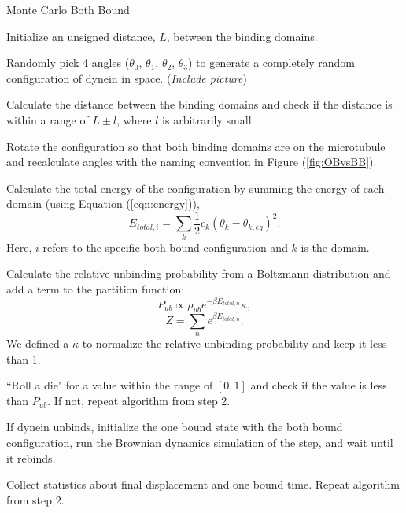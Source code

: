 \begin{algorithm}[H]
	\caption{Monte Carlo Both Bound}
	\label{alg:MonteCarlo}

	\begin{alg}
	\item Initialize an unsigned distance, $L$, between the binding domains.
	
	\item Randomly pick 4 angles ($\theta_0$, $\theta_1$, $\theta_2$, $\theta_3$) to generate a completely random configuration of dynein in space. (\textit{Include picture})
	
	\item Calculate the distance between the binding domains and check if the distance is within a range of $L\pm l$, where $l$ is arbitrarily small.
	
	\item Rotate the configuration so that both binding domains are on the microtubule and recalculate angles with the naming convention in Figure (\ref{fig:OBvsBB}).
	
	\item Calculate the total energy of the configuration by summing the energy of each domain (using Equation (\ref{eqn:energy})),
	\begin{equation}
		E_{total, i}=\sum_{k}\frac{1}{2}c_k(\theta_k-\theta_{k,eq})^2.
	\end{equation}
	Here, $i$ refers to the specific both bound configuration and $k$ is the domain.	
	
	\item Calculate the relative unbinding probability from a Boltzmann distribution and add a term to the partition function:
	\begin{equation}
		P_{ub} \propto \rho_{ub}e^{-\beta E_{total, n}}\kappa,
	\end{equation}
	\begin{equation}
		Z=\sum_{n}e^{\beta E_{total, n}}.
	\end{equation}
	We defined a $\kappa$ to normalize the relative unbinding probability and keep it less than 1. 
	
	\item ``Roll a die" for a value within the range of $[0,1]$ and check if the value is less than $P_{ub}$. If not, repeat algorithm from step 2.
	
	\item If dynein unbinds, initialize the one bound state with the both bound configuration, run the Brownian dynamics simulation of the step, and wait until it rebinds.
	
	\item Collect statistics about final displacement and one bound time. Repeat algorithm from step 2. 
	
	\end{alg}

\end{algorithm}

